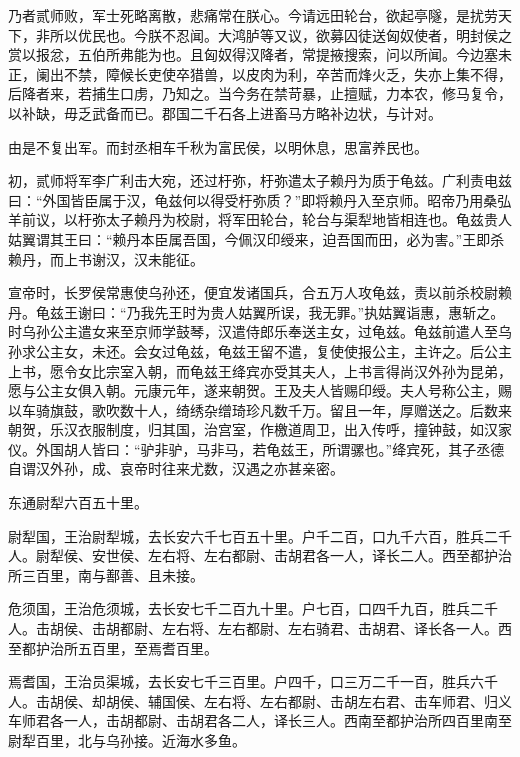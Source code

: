 \documentclass[12pt,UTF8]{ctexbook}
\begin{document}
乃者贰师败，军士死略离散，悲痛常在朕心。今请远田轮台，欲起亭隧，是扰劳天下，非所以优民也。今朕不忍闻。大鸿胪等又议，欲募囚徒送匈奴使者，明封侯之赏以报忿，五伯所弗能为也。且匈奴得汉降者，常提掖搜索，问以所闻。今边塞未正，阑出不禁，障候长吏使卒猎兽，以皮肉为利，卒苦而烽火乏，失亦上集不得，后降者来，若捕生口虏，乃知之。当今务在禁苛暴，止擅赋，力本农，修马复令，以补缺，毋乏武备而已。郡国二千石各上进畜马方略补边状，与计对。



由是不复出军。而封丞相车千秋为富民侯，以明休息，思富养民也。



初，贰师将军李广利击大宛，还过杅弥，杅弥遣太子赖丹为质于龟兹。广利责电兹曰：“外国皆臣属于汉，龟兹何以得受杅弥质？”即将赖丹入至京师。昭帝乃用桑弘羊前议，以杅弥太子赖丹为校尉，将军田轮台，轮台与渠犁地皆相连也。龟兹贵人姑翼谓其王曰：“赖丹本臣属吾国，今佩汉印绶来，迫吾国而田，必为害。”王即杀赖丹，而上书谢汉，汉未能征。



宣帝时，长罗侯常惠使乌孙还，便宜发诸国兵，合五万人攻龟兹，责以前杀校尉赖丹。龟兹王谢曰：“乃我先王时为贵人姑翼所误，我无罪。”执姑翼诣惠，惠斩之。时乌孙公主遣女来至京师学鼓琴，汉遣侍郎乐奉送主女，过龟兹。龟兹前遣人至乌孙求公主女，未还。会女过龟兹，龟兹王留不遣，复使使报公主，主许之。后公主上书，愿令女比宗室入朝，而龟兹王绛宾亦受其夫人，上书言得尚汉外孙为昆弟，愿与公主女俱入朝。元康元年，遂来朝贺。王及夫人皆赐印绶。夫人号称公主，赐以车骑旗鼓，歌吹数十人，绮绣杂缯琦珍凡数千万。留且一年，厚赠送之。后数来朝贺，乐汉衣服制度，归其国，治宫室，作檄道周卫，出入传呼，撞钟鼓，如汉家仪。外国胡人皆曰：“驴非驴，马非马，若龟兹王，所谓骡也。”绛宾死，其子丞德自谓汉外孙，成、哀帝时往来尤数，汉遇之亦甚亲密。



东通尉犁六百五十里。



尉犁国，王治尉犁城，去长安六千七百五十里。户千二百，口九千六百，胜兵二千人。尉犁侯、安世侯、左右将、左右都尉、击胡君各一人，译长二人。西至都护治所三百里，南与鄯善、且未接。



危须国，王治危须城，去长安七千二百九十里。户七百，口四千九百，胜兵二千人。击胡侯、击胡都尉、左右将、左右都尉、左右骑君、击胡君、译长各一人。西至都护治所五百里，至焉耆百里。



焉耆国，王治员渠城，去长安七千三百里。户四千，口三万二千一百，胜兵六千人。击胡侯、却胡侯、辅国侯、左右将、左右都尉、击胡左右君、击车师君、归义车师君各一人，击胡都尉、击胡君各二人，译长三人。西南至都护治所四百里南至尉犁百里，北与乌孙接。近海水多鱼。
\end{document}

